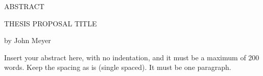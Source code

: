 \documentclass[12pt, oneside]{book2}
\newcommand{\documentTitle}{THESIS PROPOSAL TITLE}
\newcommand{\documentAuthor}{John Meyer}
\theoremstyle{definition}
\begin{document}
\thispagestyle{empty}
\singlespacing

\begin{center}

    ABSTRACT

    \vspace{2.0cm}

    \documentTitle

    \vspace{1.0cm}

    by \documentAuthor

    \vspace{1.0cm}

\end{center}

\noindent
Insert your abstract here, with no indentation, and it must be a maximum of 200 words.
Keep the spacing as is (single spaced).
It must be one paragraph.

\newpage

\thispagestyle{empty}

\frontmatter

\doublespacing
\end{document}
